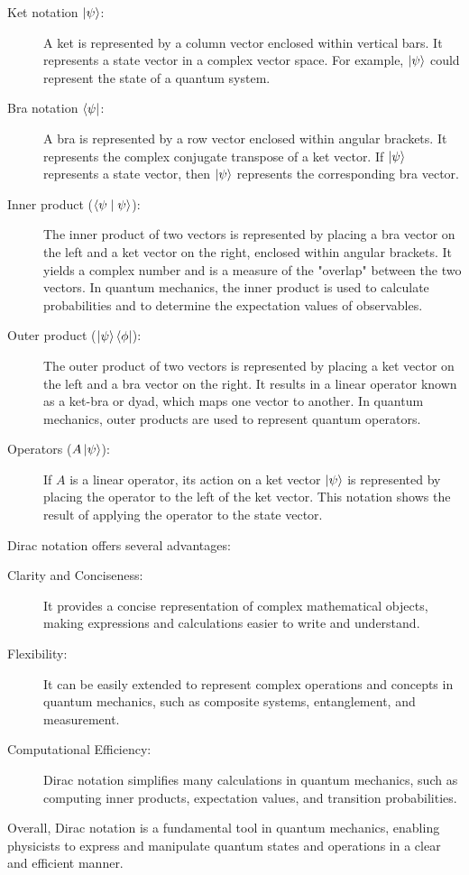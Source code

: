 \begin{description}
  \item[Ket notation $\ket{\psi}$:]
  A ket is represented by a column vector enclosed within vertical bars.
  It represents a state vector in a complex vector space.
  For example, $\ket{\psi}$ could represent the state of a quantum system.

  \item[Bra notation $\bra{\psi}$:]
  A bra is represented by a row vector enclosed within angular brackets.
  It represents the complex conjugate transpose of a ket vector.
  If $\ket{\psi}$ represents a state vector, then $\ket{\psi}$ represents the corresponding bra vector.

  \item[Inner product ($\braket{\psi \mid \psi}$):]
  The inner product of two vectors is represented by placing a bra vector on the left and a ket vector on the right, enclosed within angular brackets.
  It yields a complex number and is a measure of the "overlap" between the two vectors.
  In quantum mechanics, the inner product is used to calculate probabilities and to determine the expectation values of observables.

  \item[Outer product ($\ket{\psi}\bra{\phi}$):]
  The outer product of two vectors is represented by placing a ket vector on the left and a bra vector on the right.
  It results in a linear operator known as a ket-bra or dyad, which maps one vector to another.
  In quantum mechanics, outer products are used to represent quantum operators.

  \item[Operators ($A\ket{\psi}$):]
  If $A$ is a linear operator, its action on a ket vector $\ket{\psi}$ is represented by placing the operator to the left of the ket vector.
  This notation shows the result of applying the operator to the state vector.
\end{description}
Dirac notation offers several advantages:
\begin{description}
    \item[Clarity and Conciseness:]
    It provides a concise representation of complex mathematical objects, making expressions and calculations easier to write and understand.
    \item[Flexibility:]
    It can be easily extended to represent complex operations and concepts in quantum mechanics, such as composite systems, entanglement, and measurement.
    \item[Computational Efficiency:]
    Dirac notation simplifies many calculations in quantum mechanics, such as computing inner products, expectation values, and transition probabilities.
\end{description}
Overall, Dirac notation is a fundamental tool in quantum mechanics, enabling physicists to express and manipulate quantum states and operations in a clear and efficient manner.
